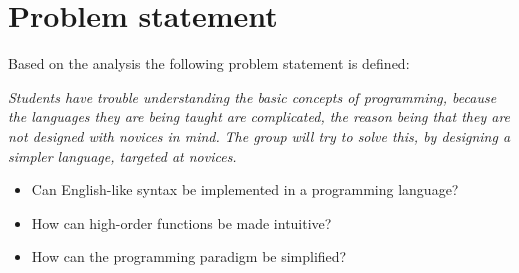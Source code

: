 \newpage
\section{Problem statement}
Based on the analysis the following problem statement is defined:
\begin{center}
	\textit{Students have trouble understanding the basic concepts of programming, because the languages they are being taught are complicated, the reason being that they are not designed with novices in mind.}
	\textit{The group will try to solve this, by designing a simpler language, targeted at novices.}

\begin{itemize}
	\item Can English-like syntax be implemented in a programming language?
	\item How can high-order functions be made intuitive?
	\item How can the programming paradigm be simplified?
\end{itemize}
\end{center}
